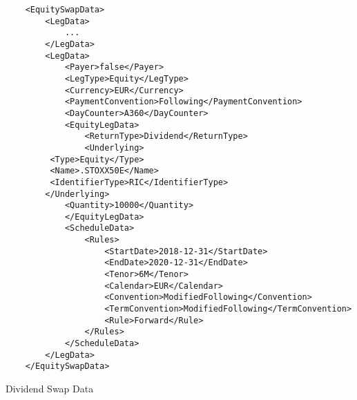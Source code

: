 \begin{listing}[H]
\begin{verbatim}
    <EquitySwapData>
        <LegData>
            ...
        </LegData>
        <LegData>
            <Payer>false</Payer>
            <LegType>Equity</LegType>
            <Currency>EUR</Currency>
            <PaymentConvention>Following</PaymentConvention>
            <DayCounter>A360</DayCounter>
            <EquityLegData>
                <ReturnType>Dividend</ReturnType>
                <Underlying>
		 <Type>Equity</Type>
		 <Name>.STOXX50E</Name>
		 <IdentifierType>RIC</IdentifierType>
		</Underlying>
	        <Quantity>10000</Quantity>
            </EquityLegData>
            <ScheduleData>
                <Rules>
                    <StartDate>2018-12-31</StartDate>
                    <EndDate>2020-12-31</EndDate>
                    <Tenor>6M</Tenor>
                    <Calendar>EUR</Calendar>
                    <Convention>ModifiedFollowing</Convention>
                    <TermConvention>ModifiedFollowing</TermConvention>
                    <Rule>Forward</Rule>
                </Rules>
            </ScheduleData>
        </LegData>
    </EquitySwapData>
\end{verbatim}
\caption{Dividend Swap Data}
\label{lst:dividendswap}
\end{listing}
